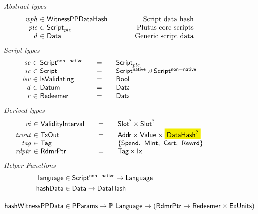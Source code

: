 \begin{figure*}[htb]
  \emph{Abstract types}
  \begin{equation*}
    \begin{array}{r@{~\in~}l@{\quad\quad\quad\quad}r}
      \var{wph} &\WitnessPPDataHash & \text{Script data hash}\\
      \var{plc} & \ScriptPlutus & \text{Plutus core scripts} \\
      \var{d} & \Data & \text{Generic script data}
    \end{array}
  \end{equation*}
  \emph{Script types}
  \begin{equation*}
    \begin{array}{r@{~\in~}l@{\qquad=\qquad}lr}
      \var{sc} & \ScriptNonNative & \ScriptPlutus \\
      \var{sc} & \Script & \ScriptNative \uniondistinct \ScriptNonNative \\
      \var{isv} & \IsValidating & \Bool \\
      \var{d} & \Datum & \Data \\
      \var{r} & \Redeemer & \Data
    \end{array}
  \end{equation*}
%
  \emph{Derived types}
  \begin{equation*}
    \begin{array}{r@{~\in~}l@{\qquad=\qquad}lr}
      \var{vi}
      & \ValidityInterval
      & \Slot^? \times \Slot^?
      \\
      \var{txout}
      & \TxOut
      & \Addr \times \Value \times \hldiff{\DataHash^?}
      \\
      \var{tag}
      & \Tag
      & \{\mathsf{Spend},~\mathsf{Mint},~\mathsf{Cert},~\mathsf{Rewrd}\}
      \\
      \var{rdptr}
      & \RdmrPtr
      & \Tag \times \Ix
    \end{array}
  \end{equation*}
  \emph{Helper Functions}
  \begin{align*}
    \fun{language}& \in \ScriptNonNative \to \Language\\
    \fun{hashData}& \in \Data \to \DataHash
    \nextdef
    \fun{hashWitnessPPData}&\in\PParams \to \powerset{\Language} \to (\RdmrPtr \mapsto \Redeemer \times \ExUnits)\\

\end{align*}
\end{figure*}
